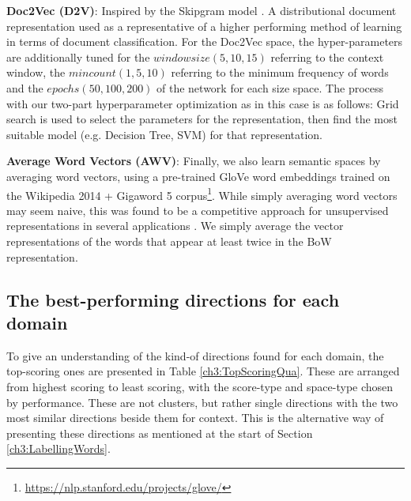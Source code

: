 \textbf{Doc2Vec (D2V)}: Inspired by the Skipgram model \cite{DBLP:conf/icml/LeM14}.  A distributional document representation used as a representative of a higher performing method of learning in terms of document classification. For the Doc2Vec space, the hyper-parameters are additionally tuned for the $window size (5, 10, 15)$ referring to the context window, the $min count (1, 5, 10)$ referring to the minimum frequency of words and the $epochs (50, 100, 200)$ of the network for each size space. The process with our two-part hyperparameter optimization as in this case is as follows: Grid search is used to select the parameters for the representation, then find the most suitable model (e.g. Decision Tree, SVM) for that representation. 

\textbf{Average Word Vectors (AWV)}: Finally, we also learn semantic spaces by averaging word vectors, using a pre-trained GloVe word embeddings trained on the Wikipedia 2014 + Gigaword 5 corpus\footnote{\url{https://nlp.stanford.edu/projects/glove/}}. While simply averaging word vectors may seem naive, this was found to be a competitive approach for unsupervised representations in several applications \cite{DBLP:conf/naacl/HillCK16}. We simply average the vector representations of the words that appear at least twice in the BoW representation.


\subsection{The best-performing directions for each domain}

To give an understanding of the kind-of directions found for each domain, the top-scoring ones are presented in Table \ref{ch3:TopScoringQua}. These are arranged from highest scoring to least scoring, with the score-type and space-type chosen by performance. These are not clusters, but rather single directions with the two most similar directions beside them for context. This is the alternative way of presenting these directions as mentioned at the start of Section \ref{ch3:LabellingWords}. 

